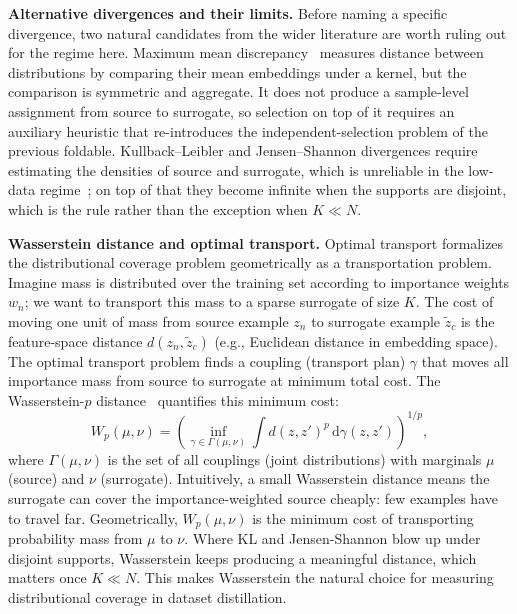 \documentclass[12pt, a4paper, twoside]{book}
\numberwithin{equation}{chapter}
\theoremstyle{plain}
\theoremstyle{definition}
\theoremstyle{remark}
\newenvironment{foldable}{}{}
\newcommand*{\eg}{e.g.}
\begin{document}
\begin{foldable}
  \textbf{Alternative divergences and their limits.}
  Before naming a specific divergence, two natural candidates from the wider literature are worth ruling out for the regime here.
  Maximum mean discrepancy~\cite{gretton2012kernel} measures distance between distributions by comparing their mean embeddings under a kernel, but the comparison is symmetric and aggregate.
  It does not produce a sample-level assignment from source to surrogate, so selection on top of it requires an auxiliary heuristic that re-introduces the independent-selection problem of the previous foldable.
  Kullback--Leibler and Jensen--Shannon divergences require estimating the densities of source and surrogate, which is unreliable in the low-data regime~\cite{paninski2003estimation}; on top of that they become infinite when the supports are disjoint, which is the rule rather than the exception when $K \ll N$.
\end{foldable}

\begin{foldable}
  \textbf{Wasserstein distance and optimal transport.}
  Optimal transport formalizes the distributional coverage problem geometrically as a transportation problem.
  Imagine mass is distributed over the training set according to importance weights $w_n$; we want to transport this mass to a sparse surrogate of size $K$.
  The cost of moving one unit of mass from source example $z_n$ to surrogate example $\tilde{z}_c$ is the feature-space distance $d(z_n, \tilde{z}_c)$ (\eg, Euclidean distance in embedding space).
  The optimal transport problem finds a coupling (transport plan) $\gamma$ that moves all importance mass from source to surrogate at minimum total cost.
  The Wasserstein-$p$ distance~\cite{villani2008optimal} quantifies this minimum cost:
  \begin{equation}
    \label{eq:wasserstein}
    W_p(\mu, \nu) = \left(\inf_{\gamma \in \Gamma(\mu,\nu)} \int d(z, z')^p \, \text{d}\gamma(z, z') \right)^{1/p},
  \end{equation}
  where $\Gamma(\mu, \nu)$ is the set of all couplings (joint distributions) with marginals $\mu$ (source) and $\nu$ (surrogate).
  Intuitively, a small Wasserstein distance means the surrogate can cover the importance-weighted source cheaply: few examples have to travel far.
  Geometrically, $W_p(\mu, \nu)$ is the minimum cost of transporting probability mass from $\mu$ to $\nu$.
  Where \ac{KL} and Jensen-Shannon blow up under disjoint supports, Wasserstein keeps producing a meaningful distance, which matters once $K \ll N$.
  This makes Wasserstein the natural choice for measuring distributional coverage in dataset distillation.
\end{foldable}
\end{document}
